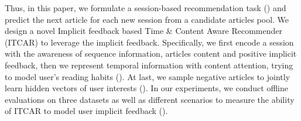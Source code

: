 
Thus, in this paper, we formulate a session-based recommendation task 
() and predict the next article 
for each new session from a candidate articles pool. We design a novel 
Implicit feedback based Time \& Content Aware Recommender (ITCAR) to leverage the 
implicit feedback. Specifically, we first encode a session with the awareness 
of sequence information, articles content and positive implicit feedback, 
then we represent temporal information with content attention, 
trying to model user's reading habits (). 
At last, we sample negative articles to jointly learn hidden vectors of user 
interests (). 
In our experiments, we conduct offline evaluations on three datasets as 
well as different scenarios to measure the ability of ITCAR to model user 
implicit feedback ().

